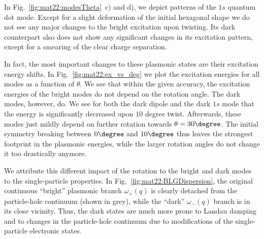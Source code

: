 In Fig.~\ref{fig:mat22:modesTheta}~c) and d), we depict patterns of the $1s$ quantum dot mode. Except for a slight deformation of the initial hexagonal shape we do not see any major changes to the bright excitation upon twisting. Its dark counterpart also does not show any significant changes in its excitation pattern, except for a smearing of the clear charge separation.

\vspace{-0.2cm}

\vspace{-0.4cm}In fact, the most important changes to these plasmonic states are their excitation energy shifts. In Fig.~\ref{fig:mat22:ex_vs_deg} we plot the excitation energies for all modes as a function of $\theta$. We see that within the given accuracy, the excitation energies of the bright modes do not depend on the rotation angle. The dark modes, however, do. We see for both the dark dipole and the dark $1s$ mode that the energy is significantly decreased upon $10$ degree twist. Afterwards, these modes just mildly depend on further rotation towards $\theta=30\degree$. The initial symmetry breaking between $0\degree$ and $10\degree$ thus leaves the strongest footprint in the plasmonic energies, while the larger rotation angles do not change it too drastically anymore. 

We attribute this different impact of the rotation to the bright and dark modes to the single-particle properties. In Fig.~\ref{fig:mat22:BLGDispersion}, the original continuous ``bright'' plasmonic branch $\omega_+(q)$ is clearly detached from the particle-hole continuum (shown in grey), while the ``dark'' $\omega_-(q)$ branch is in its close vicinity. Thus, the dark states are much more prone to Landau damping and to changes in the particle-hole continuum due to modifications of the single-particle electronic states. 

